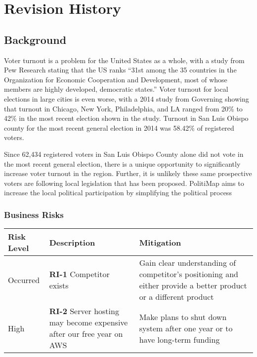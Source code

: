 \section{Revision History}
\subsection{Background}
Voter turnout is a problem for the United States as a whole, with a
study from Pew Research stating that the US ranks “31st among the 35
countries in the Organization for Economic Cooperation and
Development, most of whose members are highly developed, democratic
states.”  \cite{pew} Voter turnout for local elections in large cities
is even worse, with a 2014 study from Governing showing that turnout
in Chicago, New York, Philadelphia, and LA ranged from 20\% to 42\% in
the most recent election shown in the study. \cite{governing} Turnout
in San Luis Obispo county for the most recent general election in 2014
was 58.42\% of registered voters. \cite{slocounty}

Since 62,434 registered voters in San Luis Obispo County alone did not vote in the most recent
general election, there is a unique opportunity to significantly increase
voter turnout in the region. Further, it is unlikely these same prospective voters are following local legislation that has been proposed. PolitiMap aims to increase the local political participation by simplifying the political process

\subsubsection{Business Risks}
\begin{tabu}{lXX}
  \toprule
  Risk Level & Description & Mitigation \\
  \midrule
  Occurred &
  \textbf{RI-1} Competitor exists &
  Gain clear
  understanding of competitor's positioning and either provide a
  better product or a different product\\

  High &
  \textbf{RI-2} Server hosting may become expensive after our
  free year on AWS &
  Make plans to shut down system after one year or to
  have long-term funding \\
  \bottomrule
\end{tabu}

